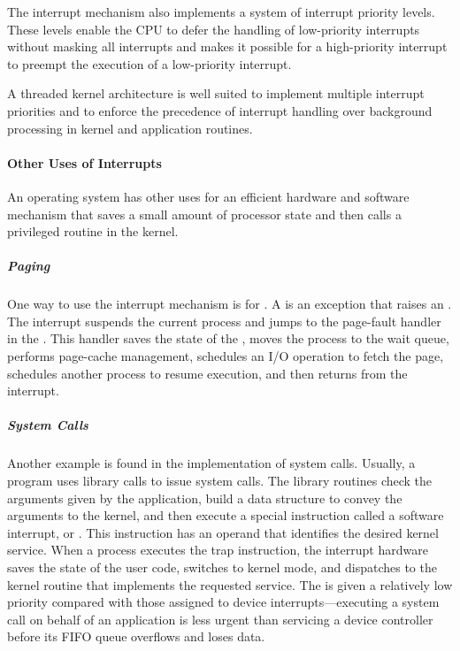 The interrupt mechanism also implements a system of interrupt priority levels.
These levels enable the CPU to defer the handling of low-priority interrupts without masking all interrupts and makes it possible for a high-priority interrupt to preempt the execution of a low-priority interrupt.

A threaded kernel architecture is well suited to implement multiple interrupt priorities and to enforce the precedence of interrupt handling over background processing in kernel and application routines.

\paragraph{Other Uses of Interrupts}\label{par:Other_Interrupt_Uses}
An operating system has other uses for an efficient hardware and software mechanism that saves a small amount of processor state and then calls a privileged routine in the kernel.

\subparagraph{Paging}\label{subpar:Paging_Interrupts}
One way to use the interrupt mechanism is for  .
A  is an exception that raises an .
The interrupt suspends the current process and jumps to the page-fault handler in the .
This handler saves the state of the , moves the process to the wait queue, performs page-cache management, schedules an I/O operation to fetch the page, schedules another process to resume execution, and then returns from the interrupt.

\subparagraph{System Calls}\label{subpar:System_Call_Interrupts}
Another example is found in the implementation of system calls.
Usually, a program uses library calls to issue system calls.
The library routines check the arguments given by the application, build a data structure to convey the arguments to the kernel, and then execute a special instruction called a software interrupt, or .
This instruction has an operand that identifies the desired kernel service.
When a process executes the trap instruction, the interrupt hardware saves the state of the user code, switches to kernel mode, and dispatches to the kernel routine that implements the requested service.
The  is given a relatively low  priority compared with those assigned to device interrupts—executing a system call on behalf of an application is less urgent than servicing a device controller before its FIFO queue overflows and loses data.


